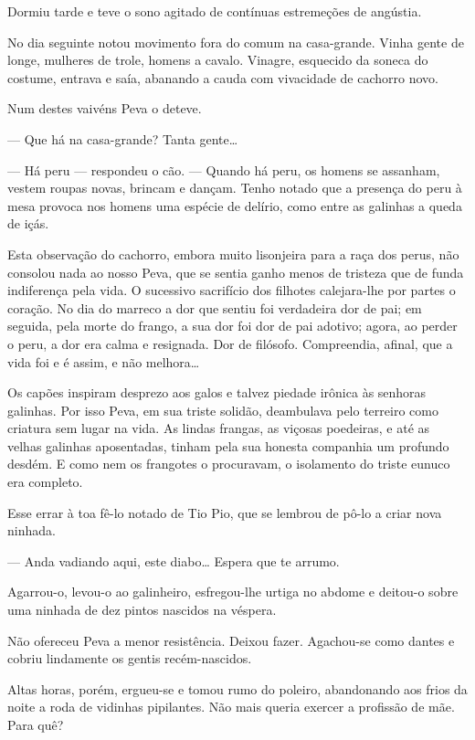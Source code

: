 Dormiu tarde e teve o sono agitado de contínuas estremeções de angústia.

No dia seguinte notou movimento fora do comum na casa-grande. Vinha
gente de longe, mulheres de trole, homens a cavalo. Vinagre, esquecido
da soneca do costume, entrava e saía, abanando a cauda com vivacidade de
cachorro novo.

Num destes vaivéns Peva o deteve.

--- Que há na casa-grande? Tanta gente\ldots{}

--- Há peru --- respondeu o cão. --- Quando há peru, os homens se
assanham, vestem roupas novas, brincam e dançam. Tenho notado que a
presença do peru à mesa provoca nos homens uma espécie de delírio, como
entre as galinhas a queda de içás.

Esta observação do cachorro, embora muito lisonjeira para a raça dos
perus, não consolou nada ao nosso Peva, que se sentia ganho menos de
tristeza que de funda indiferença pela vida. O sucessivo sacrifício dos
filhotes calejara-lhe por partes o coração. No dia do marreco a dor que
sentiu foi verdadeira dor de pai; em seguida, pela morte do frango, a
sua dor foi dor de pai adotivo; agora, ao perder o peru, a dor era calma
e resignada. Dor de filósofo. Compreendia, afinal, que a vida foi e é
assim, e não melhora\ldots{}

Os capões inspiram desprezo aos galos e talvez piedade irônica às
senhoras galinhas. Por isso Peva, em sua triste solidão, deambulava pelo
terreiro como criatura sem lugar na vida. As lindas frangas, as viçosas
poedeiras, e até as velhas galinhas aposentadas, tinham pela sua honesta
companhia um profundo desdém. E como nem os frangotes o procuravam, o
isolamento do triste eunuco era completo.

Esse errar à toa fê-lo notado de Tio Pio, que se lembrou de pô-lo a
criar nova ninhada.

--- Anda vadiando aqui, este diabo\ldots{} Espera que te arrumo.

Agarrou-o, levou-o ao galinheiro, esfregou-lhe urtiga no abdome e
deitou-o sobre uma ninhada de dez pintos nascidos na véspera.

Não ofereceu Peva a menor resistência. Deixou fazer. Agachou-se como
dantes e cobriu lindamente os gentis recém-nascidos.

Altas horas, porém, ergueu-se e tomou rumo do poleiro, abandonando aos
frios da noite a roda de vidinhas pipilantes. Não mais queria exercer a
profissão de mãe. Para quê?

